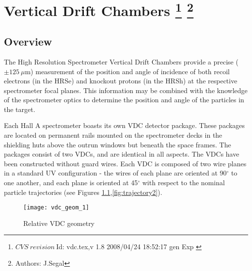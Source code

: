 \chapter[Vertical Drift Chambers]{Vertical Drift Chambers
\footnote{
  $CVS~revision~ $Id: vdc.tex,v 1.8 2008/04/24 18:52:17 gen Exp $ $
}
\footnote{Authors: J.Segal }
}




\section{Overview}

The High Resolution Spectrometer Vertical Drift Chambers provide a
precise ($\pm 125~\mu$m) measurement of the position and angle of
incidence of both recoil electrons (in the HRSe) and knockout protons
(in the HRSh) at the respective spectrometer focal planes.  This
information may be combined with the knowledge of the spectrometer
optics to determine the position and angle of the particles in the
target.

Each Hall A spectrometer boasts its own VDC detector package.  These
packages are located on permanent rails mounted on the spectrometer
decks in the shielding huts above the outrun windows but beneath the
space frames.  The packages consist of two VDCs, and are identical
in all aspects.  The VDCs have been constructed without guard wires.
Each VDC is composed of two wire planes in a standard UV
configuration - the wires of each plane are oriented at 90$^\circ$
to one another, and each plane is oriented at 45$^\circ$ with respect
to the nominal particle trajectories (see Figures
\ref{fig:trajectory1},\ref{fig:trajectory2}).

\begin{figure}
\begin{center}
\texttt{[image: vdc\_geom\_1]}
\caption[Detectors: VDC Geometry]{Relative VDC geometry}
\label{fig:trajectory1}
\end{center}
\end{figure}

